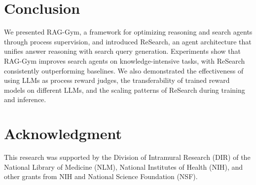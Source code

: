 \section{Conclusion}

We presented RAG-Gym, a framework for optimizing reasoning and search agents through process supervision, and introduced ReSearch, an agent architecture that unifies answer reasoning with search query generation. Experiments show that RAG-Gym improves search agents on knowledge-intensive tasks, with ReSearch consistently outperforming baselines. 
We also demonstrated the effectiveness of using LLMs as process reward judges, the transferability of trained reward models on different LLMs, and the scaling patterns of ReSearch during training and inference.

\section{Acknowledgment}
This research was supported by the Division of Intramural Research (DIR) of the National Library of Medicine (NLM), National Institutes of Health (NIH), and other grants from NIH and National Science Foundation (NSF).

